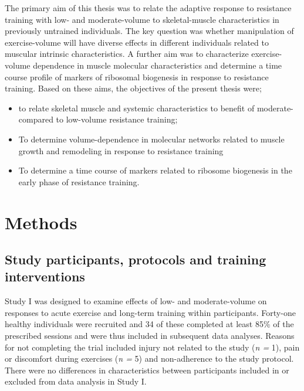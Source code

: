 \documentclass[twoside,10pt]{gihclass} %
\providecommand{\tightlist}{%
  \setlength{\itemsep}{0pt}\setlength{\parskip}{0pt}}
\begin{document}
The primary aim of this thesis was to relate the adaptive response to resistance training with low- and moderate-volume to skeletal-muscle characteristics in previously untrained individuals. The key question was whether manipulation of exercise-volume will have diverse effects in different individuals related to muscular intrinsic characteristics. A further aim was to characterize exercise-volume dependence in muscle molecular characteristics and determine a time course profile of markers of ribosomal biogenesis in response to resistance training. Based on these aims, the objectives of the present thesis were;
\begin{itemize}
\tightlist
\item
  to relate skeletal muscle and systemic characteristics to benefit of moderate- compared to low-volume resistance training;
\item
  To determine volume-dependence in molecular networks related to muscle growth and remodeling in response to resistance training
\item
  To determine a time course of markers related to ribosome biogenesis in the early phase of resistance training.
\end{itemize}
\hypertarget{methods}{%
\chapter{Methods}\label{methods}}

\hypertarget{study-participants-protocols-and-training-interventions}{%
\section{Study participants, protocols and training interventions}\label{study-participants-protocols-and-training-interventions}}

Study I was designed to examine effects of low- and moderate-volume on responses to acute exercise and long-term training within participants. Forty-one healthy individuals were recruited and 34 of these completed at least 85\% of the prescribed sessions and were thus included in subsequent data analyses. Reasons for not completing the trial included injury not related to the study (\emph{n =} 1), pain or discomfort during exercises (\emph{n = }5) and non-adherence to the study protocol. There were no differences in characteristics between participants included in or excluded from data analysis in Study I.
\end{document}
